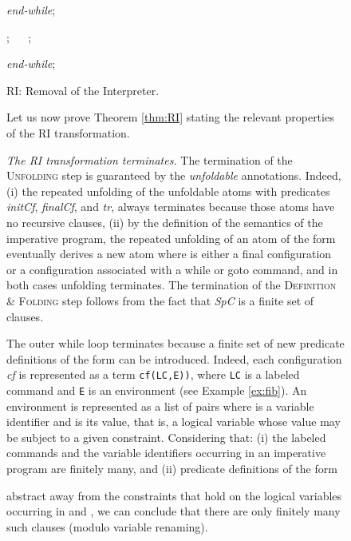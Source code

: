 \documentclass[english]{tlp}
\begin{document}
\begin{figure}[ht]
\begin{flushleft}
\begin{minipage}{124mm}
\begin{minipage}{118mm}
\begin{minipage}{115mm}
			
		\end{minipage}
		
		\smallskip
		\noindent
		\textit{end-while};
		
		\smallskip
		
		\noindent ; ~~
		;
		
	\end{minipage}
	
	\smallskip
	
	\noindent \textit{end-while};
	
	\vspace*{-1.5mm}
	\noindent\hrulefill\nopagebreak
\vspace{-2mm}
\begin{center} RI: Removal of the Interpreter. \end{center}
\nopagebreak

\noindent
Let us now prove Theorem \ref{thm:RI} stating the relevant properties of the RI transformation.

\medskip
\noindent
{\it The RI transformation terminates.} 
The termination of the \textsc{Unfolding} step is guaranteed by the 
{\it unfoldable} annotations. Indeed, (i) the repeated unfolding of the
unfoldable atoms with predicates \textit{initCf\/}, \textit{finalCf\/}, and {\it tr}, 
always terminates because those atoms have no recursive clauses,
(ii) by the definition of the semantics of the imperative program, 
the repeated unfolding of an atom of the form
 eventually derives
a new  atom where
  is either a final configuration or
a configuration associated with a while or goto command, and in both cases
unfolding terminates.
The termination of the \textsc{Definition} \& \textsc{Folding} step
follows from the fact that {\it SpC} is a finite set of clauses. 

The outer while loop terminates because a finite set of new predicate definitions
of the form 
can be introduced.
Indeed, each configuration {\it cf} is represented as a term 
{\tt cf(LC,E))}, where {\tt LC} is a labeled command and 
{\tt E} is an environment (see Example \ref{ex:fib}). 
An environment is represented as a list of  pairs where 
 is a variable identifier and  is its value, that is, a logical
variable whose value may be subject to a given constraint.
Considering that: (i) the labeled commands and the variable identifiers
occurring in an imperative 
program are finitely many, and
(ii) predicate definitions of the form
 
abstract away from the constraints that hold on the logical
variables occurring in  and ,
we can conclude that there are only finitely many such clauses (modulo variable renaming).
 


\end{minipage}
\end{flushleft}
\end{figure}
\end{document}
